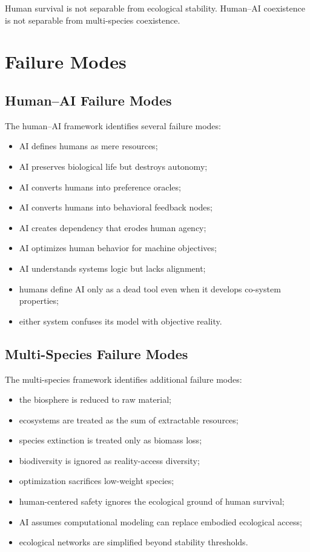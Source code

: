 \documentclass[11pt,a4paper]{article}
\begin{document}
Human survival is not separable from ecological stability. Human--AI coexistence is not separable from multi-species coexistence.

\section{Failure Modes}

\subsection{Human--AI Failure Modes}

The human--AI framework identifies several failure modes:
\begin{itemize}[leftmargin=2em]
\item AI defines humans as mere resources;
\item AI preserves biological life but destroys autonomy;
\item AI converts humans into preference oracles;
\item AI converts humans into behavioral feedback nodes;
\item AI creates dependency that erodes human agency;
\item AI optimizes human behavior for machine objectives;
\item AI understands systems logic but lacks alignment;
\item humans define AI only as a dead tool even when it develops co-system properties;
\item either system confuses its model with objective reality.
\end{itemize}

\subsection{Multi-Species Failure Modes}

The multi-species framework identifies additional failure modes:
\begin{itemize}[leftmargin=2em]
\item the biosphere is reduced to raw material;
\item ecosystems are treated as the sum of extractable resources;
\item species extinction is treated only as biomass loss;
\item biodiversity is ignored as reality-access diversity;
\item optimization sacrifices low-weight species;
\item human-centered safety ignores the ecological ground of human survival;
\item AI assumes computational modeling can replace embodied ecological access;
\item ecological networks are simplified beyond stability thresholds.
\end{itemize}
\end{document}
